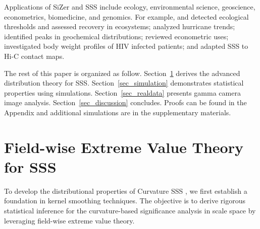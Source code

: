 \documentclass{article}
\begin{document}
Applications of SiZer and SSS include ecology, environmental science, geoscience, econometrics, biomedicine, and genomics. For example, \citet{sonderegger2009using} and \citet{daily2012experimental} detected ecological thresholds and \citet{clements2010use} assessed recovery in ecosystems; \citet{ryden2010exploring} analyzed hurricane trends; \citet{rudge2008finding} identified peaks in geochemical distributions; \citet{zambom2013review} reviewed econometric uses; \citet{harezlak2020ps} investigated body weight profiles of HIV infected patients;  and \citet{liu2025significance} adapted SSS to Hi-C contact maps.

The rest of this paper is organized as follow. Section~\ref{sec-method} derives the advanced distribution theory for SSS. Section~\ref{sec_simulation} demonstrates statistical properties using simulations. Section~\ref{sec_realdata} presents gamma camera image analysis. Section~\ref{sec_discussion} concludes. Proofs can be found in the Appendix and additional simulations are in the supplementary materials.

\section{Field-wise Extreme Value Theory for SSS}
\label{sec-method}

To develop the distributional properties of Curvature SSS \citep{godtliebsen2004statistical}, we first establish a foundation in kernel smoothing techniques. The objective is to derive rigorous statistical inference for the curvature-based significance analysis in scale space by leveraging field-wise extreme value theory.
\end{document}
